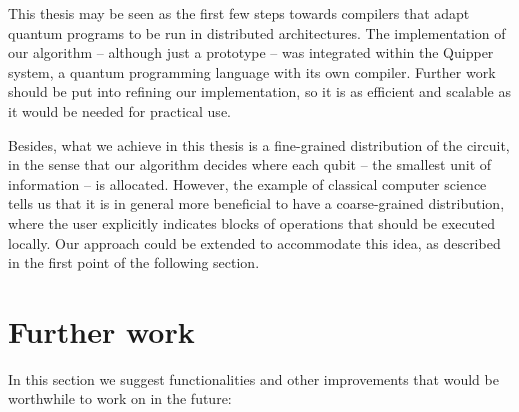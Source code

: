 This thesis may be seen as the first few steps towards compilers that adapt quantum programs to be run in distributed architectures. The implementation of our algorithm -- although just a prototype -- was integrated within the Quipper system, a quantum programming language with its own compiler. Further work should be put into refining our implementation, so it is as efficient and scalable as it would be needed for practical use. 

Besides, what we achieve in this thesis is a fine-grained distribution of the circuit, in the sense that our algorithm decides where each qubit -- the smallest unit of information -- is allocated. However, the example of classical computer science tells us that it is in general more beneficial to have a coarse-grained distribution, where the user explicitly indicates blocks of operations that should be executed locally. Our approach could be extended to accommodate this idea, as described in the first point of the following section.

\section{Further work}
\label{FurtherWork}

In this section we suggest functionalities and other improvements that would be worthwhile to work on in the future:

